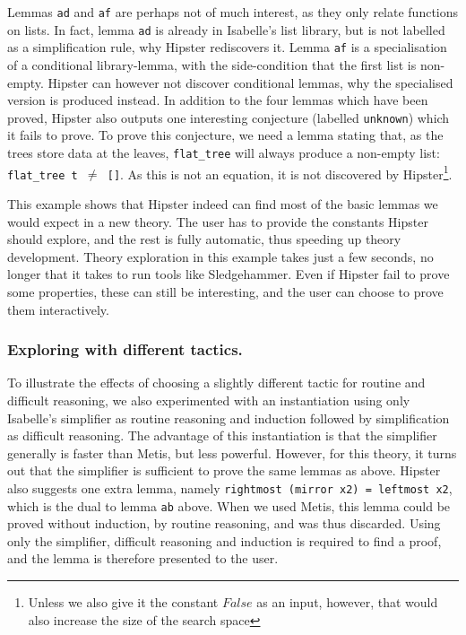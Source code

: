 Lemmas \texttt{ad} and \texttt{af} are perhaps not of much interest, as they only relate functions on lists. In fact, lemma \texttt{ad} is already in Isabelle's list library, but is not labelled as a simplification rule, why Hipster rediscovers it. Lemma \texttt{af} is a specialisation of a conditional library-lemma, with the side-condition that the first list is non-empty. Hipster can however not discover conditional lemmas, why the specialised version is produced instead. In addition to the four lemmas which have been proved, Hipster also outputs one interesting conjecture (labelled \texttt{unknown}) which it fails to prove. To prove this conjecture, we need a lemma stating that, as the trees store data at the leaves, \texttt{flat\_tree} will always produce a non-empty list: \texttt{flat\_tree t $\neq$ []}. As this is not an equation, it is not discovered by Hipster\footnote{Unless we also give it the constant $False$ as an input, however, that would also increase the size of the search space}. 
 
This example shows that Hipster indeed can find most of the basic lemmas we would expect in a new theory. The user has to provide the constants Hipster should explore, and the rest is fully automatic, thus speeding up theory development.  Theory exploration in this example takes just a few seconds, no longer that it takes to run tools like Sledgehammer. Even if Hipster fail to prove some properties, these can still be interesting, and the user can choose to prove them interactively.

\subsubsection*{Exploring with different tactics.}
To illustrate the effects of choosing a slightly different tactic for routine and difficult reasoning, we also experimented with an instantiation using only Isabelle's simplifier as routine reasoning and induction followed by simplification as difficult reasoning. The advantage of this instantiation is that the simplifier generally is faster than Metis, but less powerful. However, for this theory, it turns out that the simplifier is sufficient to prove the same lemmas as above. Hipster also suggests one extra lemma, namely \texttt{rightmost (mirror x2) = leftmost x2}, which is the dual to lemma \texttt{ab} above. When we used Metis, this lemma could be proved without induction, by routine reasoning, and was thus discarded. Using only the simplifier, difficult reasoning and induction is required to find a proof, and the lemma is therefore presented to the user. 

